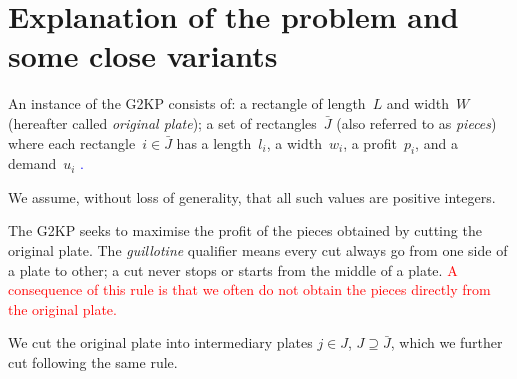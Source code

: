 \documentclass[ppgc,tese,english,formais,babel]{iiufrgs}
\newif\iffinalversion
\newcommand{\newtext}[1]{\iffinalversion%
#1%
\else%
\textcolor{blue}{#1}%
\fi%
}
\newcommand{\oldtext}[1]{\iffinalversion%
\else%
\textcolor{red}{#1}%
\fi%
}
\begin{document}
\begin{comment}
\begin{table}[h]
    \caption{Uma tabela de Exemplo}
    \begin{center}
        \begin{tabular}{c|c|p{5cm}}
            \textit{Col 1}  &   \textit{Col 2}  &   \textit{Col 3} \\
            \hline
            \hline
            Val 1           &   Val 2           & Esta coluna funciona como um parágrafo, tendo uma margem definida em 5cm. Quebras de linha funcionam como em qualquer parágrafo do tex. \\
            Valor Longo     & Val 2             & Val 3 \\
            \hline
        \end{tabular}
    \end{center}
    \legend{Fonte: Os Autores}
    \label{tbl:ex1}
\end{table}
\end{comment}

\section{Explanation of the problem and some close variants}

An instance of the G2KP consists of: a rectangle of length~\(L\) and width~\(W\) (hereafter called \emph{original plate}); a set of rectangles~\(\bar{J}\) (also referred to as \emph{pieces}) where each rectangle~\(i \in \bar{J}\) has a length~\(l_i\), a width~\(w_i\), a profit~\(p_i\), and a demand~\(u_i\)\newtext{.}
We assume, without loss of generality, that all such values are positive integers.

The G2KP seeks to maximise the profit of the pieces obtained by cutting the original plate.
The \emph{guillotine} qualifier means every cut always go from one side of a plate to other; a cut never stops or starts from the middle of a plate.
\oldtext{A consequence of this rule is that we often do not obtain the pieces directly from the original plate.}
We cut the original plate into intermediary plates \(j \in J\), \(J \supseteq \bar{J}\), which we further cut following the same rule.
\end{document}
